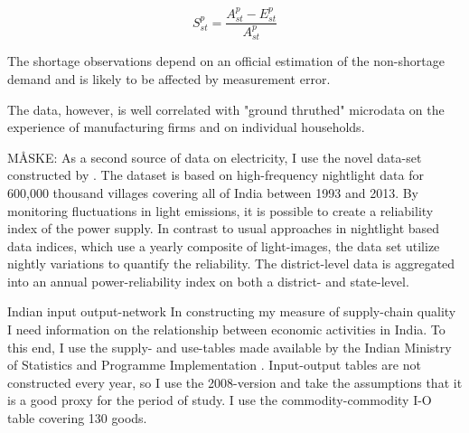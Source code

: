 \[
S^{p}_{st} = \frac{A^{p}_{st} - E^{p}_{st}}{A^{p}_{st}}
\]

The shortage observations depend on an official estimation of the non-shortage demand and is likely to be affected by measurement error. 

The data, however, is well correlated with "ground thruthed" microdata on the experience of manufacturing firms and on individual households. 








MÅSKE: 
As a second source of data on electricity, I use the novel data-set constructed by \cite{min_whose_2017-2}. The dataset is based on high-frequency nightlight data for 600,000 thousand villages covering all of India between 1993 and 2013. By monitoring fluctuations in light emissions, it is possible to create a reliability index of the power supply. In contrast to usual approaches in nightlight based data indices, which use a yearly composite of light-images, the data set utilize nightly variations to quantify the reliability. The district-level data is aggregated into an annual power-reliability index on both a district- and state-level.


Indian input output-network\label{sec:org99cb299}
In constructing my measure of supply-chain quality I need information on the relationship between economic activities in India. To this end, I use the supply- and use-tables made available by the Indian Ministry of Statistics and Programme Implementation \citep{mospi_supply_2020}. Input-output tables are not constructed every year, so I use the 2008-version and take the assumptions that it is a good proxy for the period of study. I use the commodity-commodity I-O table covering 130 goods.

